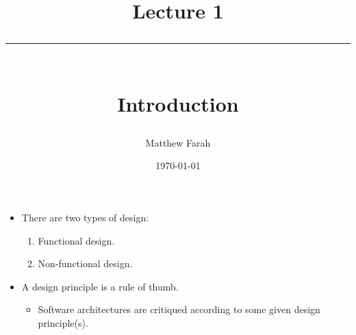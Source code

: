 \documentclass{article}
\date{
	\vspace{-.75em}
	{\large \today}
}
\title{
	\vspace*{-1.5em}
	{\Huge Lecture 1} \\
	\vspace{-1em}
	\rule{\textwidth/4}{.01em} \\
	\vspace{-.25em}
	{\Large Introduction}
	\vspace{-.75em}
}
\author{
	{\large Matthew Farah}
}
\begin{document}
\maketitle
\pagestyle{fancy}

\fi

\begin{itemize}
	\item There are two types of design:
	\begin{enumerate}
		\item Functional design.
		\item Non-functional design.
	\end{enumerate}
	\item A design principle is a rule of thumb.
	\begin{itemize}
		\item Software architectures are critiqued according to some given design principle(s).
	\end{itemize}
\end{itemize}
\ifdefined\iscombined
	\newpage
\else
	
\end{document}
